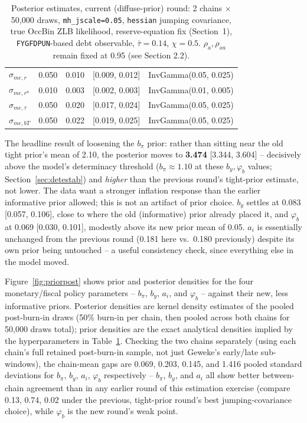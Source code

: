 \documentclass[11pt]{article}
\begin{document}
\begin{table}[h]
\begin{tabular}{lrrrl}
$\sigma_{me,r}$   & 0.050 & 0.010 & [0.009, 0.012] & InvGamma(0.05, 0.025) \\
$\sigma_{me,r^n}$ & 0.010 & 0.003 & [0.002, 0.003] & InvGamma(0.01, 0.005) \\
$\sigma_{me,\tau}$& 0.050 & 0.020 & [0.017, 0.024] & InvGamma(0.05, 0.025) \\
$\sigma_{me,bT}$  & 0.050 & 0.022 & [0.019, 0.025] & InvGamma(0.05, 0.025) \\
\bottomrule
\end{tabular}
\caption{Posterior estimates, current (diffuse-prior) round: 2 chains
$\times$ 50{,}000 draws, \texttt{mh\_jscale=0.05}, \texttt{hessian}
jumping covariance, true OccBin ZLB likelihood, reserve-equation fix
(Section~1), \texttt{FYGFDPUN}-based debt observable, $\bar\tau=0.14$,
$\chi=0.5$. $\rho_a,\rho_{xa}$ remain fixed at 0.95 (see Section 2.2).}
\label{tab:posteriors}
\end{table}

The headline result of loosening the $b_\pi$ prior: rather than sitting
near the old tight prior's mean of 2.10, the posterior moves to
\textbf{3.474} [3.344, 3.604] -- decisively above the model's
determinacy threshold ($b_\pi\approx1.10$ at these $b_y,\varphi_b$
values; Section~\ref{sec:detestab}) and \emph{higher} than the previous
round's tight-prior estimate, not lower. The data want a stronger
inflation response than the earlier informative prior allowed; this is
not an artifact of prior choice. $b_y$ settles at 0.083 [0.057, 0.106],
close to where the old (informative) prior already placed it, and
$\varphi_b$ at 0.069 [0.030, 0.101], modestly above its new prior mean
of 0.05. $a_i$ is essentially unchanged from the previous round (0.181
here vs.\ 0.180 previously) despite its own prior being untouched -- a
useful consistency check, since everything else in the model moved.

Figure~\ref{fig:priorpost} shows prior and posterior densities for the
four monetary/fiscal policy parameters -- $b_\pi$, $b_y$, $a_i$, and
$\varphi_b$ -- against their new, less informative priors. Posterior
densities are kernel density estimates of the pooled post-burn-in draws
(50\% burn-in per chain, then pooled across both chains for 50{,}000
draws total); prior densities are the exact analytical densities
implied by the hyperparameters in Table~\ref{tab:posteriors}. Checking
the two chains separately (using each chain's full retained
post-burn-in sample, not just Geweke's early/late sub-windows), the
chain-mean gaps are 0.069, 0.203, 0.145, and 1.416 pooled standard
deviations for $b_\pi$, $b_y$, $a_i$, $\varphi_b$ respectively -- $b_\pi$,
$b_y$, and $a_i$ all show better between-chain agreement than in any
earlier round of this estimation exercise (compare 0.13, 0.74, 0.02
under the previous, tight-prior round's best jumping-covariance choice),
while $\varphi_b$ is the new round's weak point.
\end{document}

